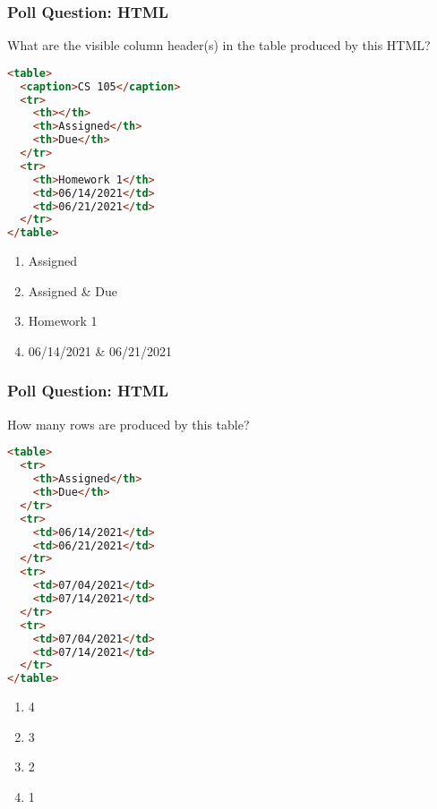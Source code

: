 \documentclass{beamer}
\begin{document}
%
%
\begin{frame}[fragile]
  \frametitle{Poll Question: HTML}
  What are the visible column header(s) in the table produced by this HTML?\\
  \begin{minipage}{0.49\textwidth}
    \begin{lstlisting}[language=html]
<table>
  <caption>CS 105</caption>
  <tr>
    <th></th>
    <th>Assigned</th>
    <th>Due</th>
  </tr>
  <tr>
    <th>Homework 1</th>
    <td>06/14/2021</td>
    <td>06/21/2021</td>
  </tr>
</table>
    \end{lstlisting} 
  \end{minipage}
  \hfill
  \begin{minipage}{0.45\textwidth}
    \begin{enumerate}[A]
      \item Assigned
      \item Assigned \& Due
      \item Homework 1
      \item 06/14/2021 \& 06/21/2021
    \end{enumerate}
  \end{minipage}
\end{frame}

%
%
\begin{frame}[fragile]
  \frametitle{Poll Question: HTML}
  How many rows are produced by this table?\\
  \begin{minipage}{0.49\textwidth}
  \begin{lstlisting}[language=html, basicstyle=\scriptsize]
<table>
  <tr>
    <th>Assigned</th>
    <th>Due</th>
  </tr>
  <tr>
    <td>06/14/2021</td>
    <td>06/21/2021</td>
  </tr>
  <tr>
    <td>07/04/2021</td>
    <td>07/14/2021</td>
  </tr>
  <tr>
    <td>07/04/2021</td>
    <td>07/14/2021</td>
  </tr>
</table>
    \end{lstlisting} 
  \end{minipage}
  \hfill
  \begin{minipage}{0.39\textwidth}
    \begin{enumerate}[A]
      \item 4
      \item 3
      \item 2
      \item 1
    \end{enumerate}
  \end{minipage}
\end{frame}
\end{document}
